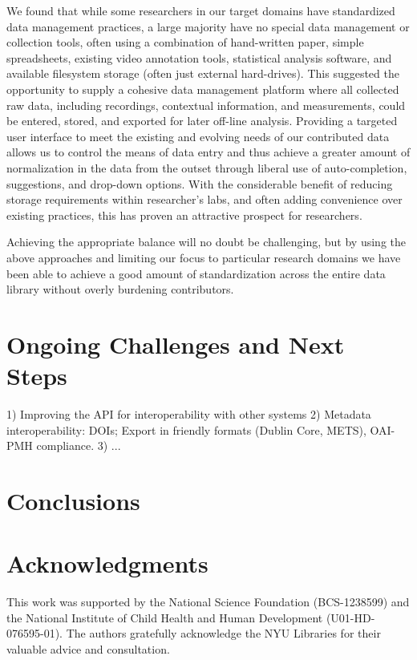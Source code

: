 \documentclass{sig-alternate}
\begin{document}
We found that while some researchers in our target domains have standardized data management practices, a large majority have no special data management or collection tools, often using a combination of hand-written paper, simple spreadsheets, existing video annotation tools, statistical analysis software, and available filesystem storage (often just external hard-drives).
This suggested the opportunity to supply a cohesive data management platform where all collected raw data, including recordings, contextual information, and measurements, could be entered, stored, and exported for later off-line analysis.
Providing a targeted user interface to meet the existing and evolving needs of our contributed data allows us to control the means of data entry and thus achieve a greater amount of normalization in the data from the outset through liberal use of auto-completion, suggestions, and drop-down options.
With the considerable benefit of reducing storage requirements within researcher's labs, and often adding convenience over existing practices, this has proven an attractive prospect for researchers.

Achieving the appropriate balance will no doubt be challenging, but by using the above approaches and limiting our focus to particular research domains we have been able to achieve a good amount of standardization across the entire data library without overly burdening contributors.


\section{Ongoing Challenges and Next Steps}
  
 1) Improving the API for interoperability with other systems
 2) Metadata interoperability: DOIs; Export in friendly formats (Dublin Core, METS), OAI-PMH compliance.
 3) ...

\section{Conclusions}

\section*{Acknowledgments}

This work was supported by the National Science Foundation (BCS-1238599) and the National Institute of Child Health and Human Development (U01-HD-076595-01).
The authors gratefully acknowledge the NYU Libraries for their valuable advice and consultation.



\end{document}
